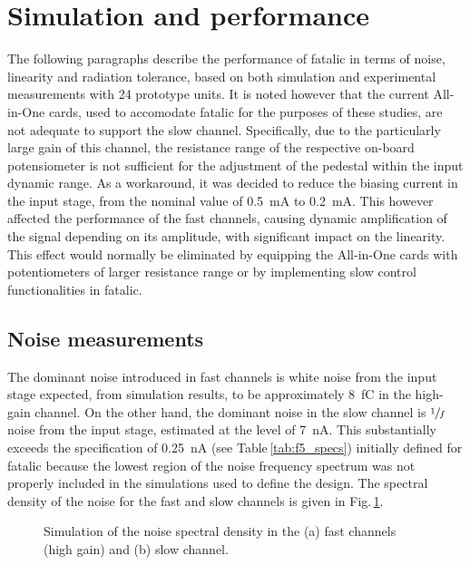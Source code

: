 \newpage
\section{Simulation and performance}
\label{subsec:SimAndPerf}

The following paragraphs describe the performance of \gls{fatalic} in terms of noise, linearity and radiation
tolerance, based on both simulation and experimental measurements with 24 prototype units. It is noted however 
that the current All-in-One cards, used to accomodate \gls{fatalic} for the purposes of these studies, are not
adequate to support the slow channel. Specifically, due to the particularly large gain of this channel, the resistance 
range of the respective on-board potensiometer is not sufficient for the adjustment of the pedestal within the input 
dynamic range. As a workaround, it was decided to reduce the biasing current in the input stage, from the nominal value 
of \SI{0.5}{mA} to \SI{0.2}{mA}. This however affected the performance of the fast channels, causing dynamic amplification 
of the signal depending on its amplitude, with significant impact on the linearity. This effect would normally be eliminated 
by equipping the All-in-One cards with potentiometers of larger resistance range or by implementing slow control 
functionalities in \gls{fatalic}.

\subsection{Noise measurements}
\label{subsec:ped}

The dominant noise introduced in fast channels is white noise from the input stage expected, from simulation results, 
to be approximately \SI{8}{fC} in the high-gain channel. On the other hand, the dominant noise in the slow channel is 
$\sfrac{1}{f}$ noise from the input stage, estimated at the level of \SI{7}{nA}. This substantially exceeds the 
specification of \SI{0.25}{nA} (see Table\,\ref{tab:f5_specs}) initially defined for \gls{fatalic} because the lowest
region of the noise frequency spectrum was not properly included in the simulations used to define the design.
The spectral density of the noise for the fast and slow channels is given in Fig.\,\ref{fig:gnoise}.

%
\begin{figure}[!bt]
\centering
{}
\caption{Simulation of the noise spectral density in the (a) fast channels (high gain) and (b) slow channel.}
\label{fig:gnoise}
\end{figure}

